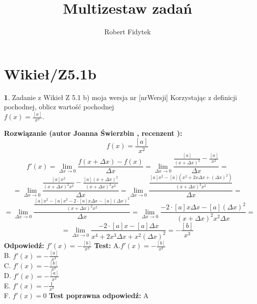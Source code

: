 \documentclass[12pt, a4paper]{article}
\title{Multizestaw zadań}
\author{Robert Fidytek}
\date{}
\theoremstyle{definition} %
\newtheorem{zad}{}
\newcommand{\kategoria}[1]{\section{#1}} %
\newcommand{\zadStart}[1]{\begin{zad}#1\newline} %
\newcommand{\zadStop}{\end{zad}}   %
\newcommand{\rozwStart}[2]{\noindent \textbf{Rozwiązanie (autor #1 , recenzent #2): }\newline} %
\newcommand{\rozwStop}{\newline}                                            %
\newcommand{\odpStart}{\noindent \textbf{Odpowiedź:}\newline}    %
\newcommand{\odpStop}{\newline}                                             %
\newcommand{\testStart}{\noindent \textbf{Test:}\newline} %
\newcommand{\testStop}{\newline} %
\newcommand{\kluczStart}{\noindent \textbf{Test poprawna odpowiedź:}\newline} %
\newcommand{\kluczStop}{\newline} %
\begin{document}
\maketitle


\kategoria{Wikieł/Z5.1b}
\zadStart{Zadanie z Wikieł Z 5.1 b) moja wersja nr [nrWersji]}
Korzystając z definicji pochodnej, oblicz wartość pochodnej \\ $f(x)=\frac{[a]}{x^2} $.
\zadStop
\rozwStart{Joanna Świerzbin}{}
$$f(x)=\frac{[a]}{x^2}$$
$$f'(x)=\lim_{\Delta x \rightarrow 0} \frac{f(x+\Delta x)-f(x)}{\Delta x} = \lim_{\Delta x \rightarrow 0} \frac{\frac{[a]}{(x+\Delta x)^2}-\frac{[a]}{x^2}}{\Delta x}= $$
$$= \lim_{\Delta x \rightarrow 0} \frac{\frac{[a]x^2}{(x+\Delta x)^2 x^2}-\frac{[a](x+\Delta x)^2}{(x+\Delta x)^2 x^2}}{\Delta x}= 
 \lim_{\Delta x \rightarrow 0} \frac{\frac{[a]x^2-[a](x^2+2x\Delta x + (\Delta x)^2)}{(x+\Delta x)^2 x^2}}{\Delta x}= $$
$$= \lim_{\Delta x \rightarrow 0} \frac{\frac{[a]x^2 -[a]x^2-2\cdot[a]x\Delta x -[a] (\Delta x)^2}{(x+\Delta x)^2 x^2}}{\Delta x}= 
\lim_{\Delta x \rightarrow 0} \frac{-2\cdot[a]x \Delta x -[a](\Delta x)^2}{(x+\Delta x)^2 x^2 \Delta x}= $$
$$= \lim_{\Delta x \rightarrow 0} \frac{-2\cdot[a]x-[a]\Delta x}{x^4 +2x^3\Delta x +x^2(\Delta x)^2}=  -\frac{[b]}{x^3}$$
\rozwStop
\odpStart
$f'(x)= -\frac{[b]}{x^3}$
\odpStop
\testStart
A.$f'(x)= -\frac{[b]}{x^3}$\\
B. $f'(x)= -\frac{[a]}{x^3}$ \\
C. $f'(x)= -\frac{[b]}{x^2}$  \\
D. $f'(x)= -\frac{[a]}{x^2}$\\
E. $f'(x)= -\frac{1}{x^3}$\\
F. $f'(x)= 0 $
\testStop
\kluczStart
A
\kluczStop
\end{document}
